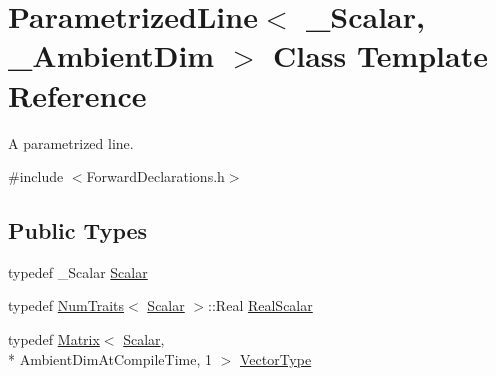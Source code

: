 \hypertarget{class_parametrized_line}{\section{Parametrized\-Line$<$ \-\_\-\-Scalar, \-\_\-\-Ambient\-Dim $>$ Class Template Reference}
\label{class_parametrized_line}
}


A parametrized line.  




{\ttfamily \#include $<$Forward\-Declarations.\-h$>$}

\subsection*{Public Types}
\begin{DoxyCompactItemize}
\item 
typedef \-\_\-\-Scalar \hyperlink{class_parametrized_line_ac4e083e5a62740e45d2158c6692b2115}{Scalar}
\item 
typedef \hyperlink{struct_num_traits}{Num\-Traits}$<$ \hyperlink{class_parametrized_line_ac4e083e5a62740e45d2158c6692b2115}{Scalar} $>$\-::Real \hyperlink{class_parametrized_line_a5a5bc8e0f892d08922cd4152622a1ea3}{Real\-Scalar}
\item 
typedef \hyperlink{class_matrix}{Matrix}$<$ \hyperlink{class_parametrized_line_ac4e083e5a62740e45d2158c6692b2115}{Scalar}, \\*
Ambient\-Dim\-At\-Compile\-Time, 1 $>$ \hyperlink{class_parametrized_line_a50da4abea0ab33894502d66459f261ba}{Vector\-Type}
\end{DoxyCompactItemize}
